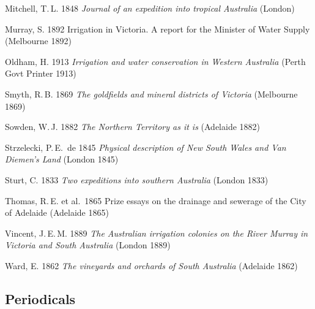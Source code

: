 Mitchell, T.\,L. 1848 \textit{Journal of an expedition into tropical
Australia} (London)

Murray, S. 1892 Irrigation in Victoria.  A report for the Minister of
Water Supply (Melbourne 1892)

Oldham, H. 1913 \textit{Irrigation and water conservation in Western
Australia} (Perth Govt Printer 1913)

Smyth, R.\,B. 1869 \textit{The goldfields and mineral districts of
Victoria} (Melbourne 1869)

Sowden, W.\,J. 1882 \textit{The Northern Territory as it is} (Adelaide
1882)

Strzelecki, P.\,E.~de 1845 \textit{Physical description of New South
Wales and Van Diemen's Land} (London 1845)

Sturt, C. 1833 \textit{Two expeditions into southern Australia}
(London 1833)

Thomas, R.\,E. et al.\ 1865 Prize essays on the drainage and sewerage of
the City of Adelaide (Adelaide 1865)

Vincent, J.\,E.\,M. 1889 \textit{The Australian irrigation colonies on
the River Murray in Victoria and South Australia} (London 1889)

Ward, E. 1862 \textit{The vineyards and orchards of South Australia}
(Adelaide 1862)

\subsection*{Periodicals}

